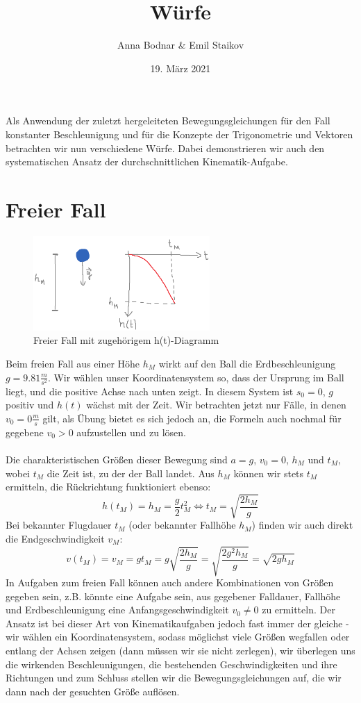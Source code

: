 \documentclass[11pt]{article}
\title{Würfe}
\author{Anna Bodnar \& Emil Staikov}
\date{19. März 2021}
\begin{document}
\maketitle
Als Anwendung der zuletzt hergeleiteten Bewegungsgleichungen für den Fall konstanter Beschleunigung und für die Konzepte der Trigonometrie und Vektoren betrachten wir nun verschiedene Würfe. Dabei demonstrieren wir auch den systematischen Ansatz der durchschnittlichen Kinematik-Aufgabe.

\section{Freier Fall}
\begin{figure}[H] 
    \centering
       \includegraphics[width=0.6\textwidth]{freier-fall.png}
       \caption{Freier Fall mit zugehörigem h(t)-Diagramm} 
\end{figure} 
Beim freien Fall aus einer Höhe $h_M$ wirkt auf den Ball die Erdbeschleunigung $g=9.81 \frac{m}{s^2}$. Wir wählen unser Koordinatensystem so, dass der Ursprung im Ball liegt, und die positive Achse nach unten zeigt. In diesem System ist $s_0 = 0$, $g$ positiv und $h(t)$ wächst mit der Zeit. Wir betrachten jetzt nur Fälle, in denen $v_0 = 0 \frac{m}{s}$ gilt, als Übung bietet es sich jedoch an, die Formeln auch nochmal für gegebene $v_0 > 0$ aufzustellen und zu lösen. \\\\
Die charakteristischen Größen dieser Bewegung sind $a = g$, $v_0 = 0$, $h_M$ und $t_M$, wobei $t_M$ die Zeit ist, zu der der Ball landet. Aus $h_M$ können wir stets $t_M$ ermitteln, die Rückrichtung funktioniert ebenso: 
\begin{equation*}
    h(t_M) = h_M = \frac{g}{2}t_M^2 \Longleftrightarrow t_M = \sqrt{\frac{2h_M}{g}}
\end{equation*}
Bei bekannter Flugdauer $t_M$ (oder bekannter Fallhöhe $h_M$) finden wir auch direkt die Endgeschwindigkeit $v_M$: 
\begin{equation*}
    v(t_M) = v_M = gt_M = g\sqrt{\frac{2h_M}{g}} = \sqrt{\frac{2g^2h_M}{g}} = \sqrt{2gh_M}
\end{equation*}
In Aufgaben zum freien Fall können auch andere Kombinationen von Größen gegeben sein, z.B. könnte eine Aufgabe sein, aus gegebener Falldauer, Fallhöhe und Erdbeschleunigung eine Anfangsgeschwindigkeit $v_0 \neq 0$ zu ermitteln. Der Ansatz ist bei dieser Art von Kinematikaufgaben jedoch fast immer der gleiche - wir wählen ein Koordinatensystem, sodass möglichst viele Größen wegfallen oder entlang der Achsen zeigen (dann müssen wir sie nicht zerlegen), wir überlegen uns die wirkenden Beschleunigungen, die bestehenden Geschwindigkeiten und ihre Richtungen und zum Schluss stellen wir die Bewegungsgleichungen auf, die wir dann nach der gesuchten Größe auflösen. 
\end{document}
